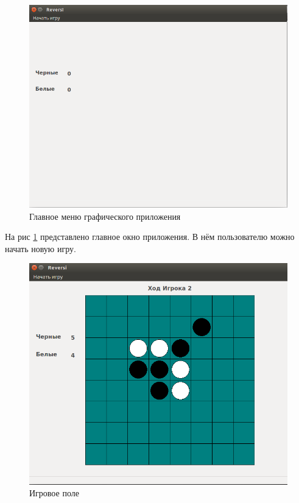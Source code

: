 \documentclass[a4paper]{article}
\begin{document}
\begin{figure}[H]
	\begin{center}
		\includegraphics[scale=0.5]{gui}
		\caption{Главное меню графического приложения} 
		\label{pic:graphicsMeinMenu} %
	\end{center}
\end{figure}

На рис \ref{pic:graphicsMeinMenu} представлено главное окно приложения. В нём пользователю можно начать новую игру. 

\begin{figure}[H]
	\begin{center}
		\includegraphics[scale=0.5]{gui2}
		\caption{Игровое поле}
		\label{pic:graphicsField}
	\end{center}
\end{figure}
\end{document}
